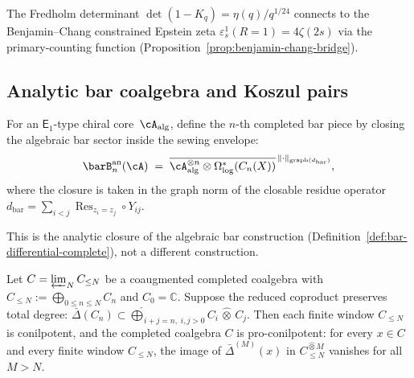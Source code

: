 \begin{remark}\label{rem:heisenberg-bc-connection}
The Fredholm determinant $\det(1 - K_q) = \eta(q)/q^{1/24}$ connects
to the Benjamin--Chang constrained Epstein zeta
$\varepsilon^1_s(R{=}1) = 4\zeta(2s)$ via the primary-counting
function (Proposition~\ref{prop:benjamin-chang-bridge}).
\end{remark}

\subsection{Analytic bar coalgebra and Koszul pairs}%
\label{subsec:analytic-bar-koszul}%

\begin{definition}%
\label{def:analytic-bar-coalgebra}%
For an $\mathsf{E}_1$-type chiral core~$\cA_{\mathrm{alg}}$, define
the $n$-th completed bar piece by closing the algebraic bar sector
inside the sewing envelope:
\[
\barB_n^{\mathrm{an}}(\cA)
\;=\;
\overline{
\cA_{\mathrm{alg}}^{\otimes n}
\otimes \Omega^*_{\log}(C_n(X))
}^{\,\|\cdot\|_{\mathrm{graph}(d_{\mathrm{bar}})}},
\]
where the closure is taken in the graph norm of the closable
residue operator~$d_{\mathrm{bar}} = \sum_{i<j}
\operatorname{Res}_{z_i = z_j} \circ Y_{ij}$.
\end{definition}

This is the analytic closure of the algebraic bar construction
(Definition~\ref{def:bar-differential-complete}), not a different
construction.

\begin{proposition}\label{prop:analytic-conilpotency}%
Let
$C=\varprojlim_N C_{\leq N}$ be a coaugmented completed coalgebra
with $C_{\leq N}:=\bigoplus_{0\leq n\leq N}C_n$ and
$C_0=\mathbb C$. Suppose the reduced coproduct preserves total degree:
$\bar{\Delta}(C_n) \subset
\widehat{\bigoplus}_{i+j=n,\; i,j>0} C_i \,\widehat{\otimes}\, C_j$.
Then each finite window $C_{\leq N}$ is conilpotent, and the
completed coalgebra $C$ is pro-conilpotent:
for every $x\in C$ and every finite window $C_{\leq N}$, the image of
$\bar{\Delta}^{(M)}(x)$ in $C_{\leq N}^{\widehat{\otimes}M}$
vanishes for all $M>N$.
\end{proposition}

